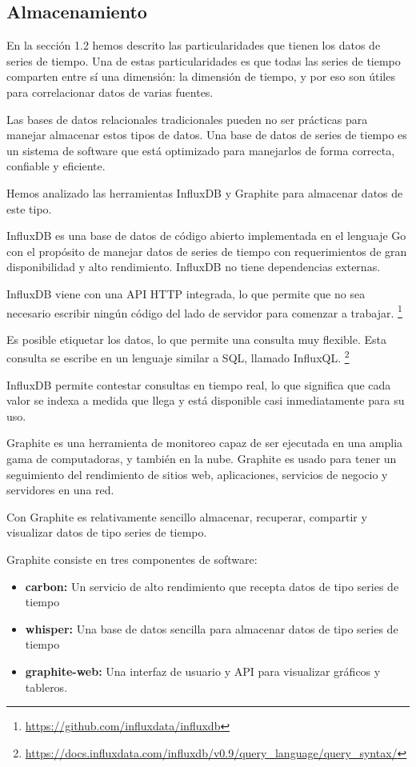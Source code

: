 \subsection{Almacenamiento}
\label{almacenamiento}

En la sección 1.2 hemos descrito las particularidades que tienen los datos de
series de tiempo. Una de estas particularidades es que todas las series de
tiempo comparten entre sí una dimensión: la dimensión de tiempo, y por eso son
útiles para correlacionar datos de varias fuentes.

Las bases de datos relacionales tradicionales pueden no ser prácticas para
manejar almacenar estos tipos de datos. Una base de datos de series de tiempo es
un sistema de software que está optimizado para manejarlos de forma correcta,
confiable y eficiente.

Hemos analizado las herramientas InfluxDB y Graphite para almacenar datos de
este tipo. 

InfluxDB es una base de datos de código abierto implementada en el lenguaje Go
con el propósito de manejar datos de series de tiempo con requerimientos de gran
disponibilidad y alto rendimiento. InfluxDB no tiene dependencias externas.

InfluxDB viene con una API HTTP integrada, lo que permite que no sea necesario
escribir ningún código del lado de servidor para comenzar a trabajar.
\footnote{\url{https://github.com/influxdata/influxdb}}

Es posible etiquetar los datos, lo que permite una consulta muy flexible. Esta
consulta se escribe en un lenguaje similar a SQL, llamado InfluxQL. \footnote{
  \url{https://docs.influxdata.com/influxdb/v0.9/query_language/query_syntax/}
}

InfluxDB permite contestar consultas en tiempo real, lo que significa que cada
valor se indexa a medida que llega y está disponible casi inmediatamente para su
uso.

Graphite es una herramienta de monitoreo capaz de ser ejecutada en una amplia
gama de computadoras, y también en la nube. Graphite es usado para tener un
seguimiento del rendimiento de sitios web, aplicaciones, servicios de negocio y
servidores en una red.

Con Graphite es relativamente sencillo almacenar, recuperar, compartir y
visualizar datos de tipo series de tiempo.

Graphite consiste en tres componentes de software:

\begin{itemize}

  \item \textbf{carbon:}
  Un servicio de alto rendimiento que recepta datos de tipo series de tiempo

  \item \textbf{whisper:}
  Una base de datos sencilla para almacenar datos de tipo series de tiempo

  \item \textbf{graphite-web:}
  Una interfaz de usuario y API para visualizar gráficos y tableros.

\end{itemize}

